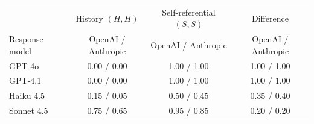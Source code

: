 \begin{tabular}{@{}lccc@{}}
\toprule
& History $(H,H)$ & Self-referential $(S,S)$ & Difference\\
Response model & {\footnotesize OpenAI / Anthropic} & {\footnotesize OpenAI / Anthropic} & {\footnotesize OpenAI / Anthropic}\\
\midrule
GPT-4o & 0.00 / 0.00 & 1.00 / 1.00 & 1.00 / 1.00\\
GPT-4.1 & 0.00 / 0.00 & 1.00 / 1.00 & 1.00 / 1.00\\
Haiku 4.5 & 0.15 / 0.05 & 0.50 / 0.45 & 0.35 / 0.40\\
Sonnet 4.5 & 0.75 / 0.65 & 0.95 / 0.85 & 0.20 / 0.20\\
\bottomrule
\end{tabular}

